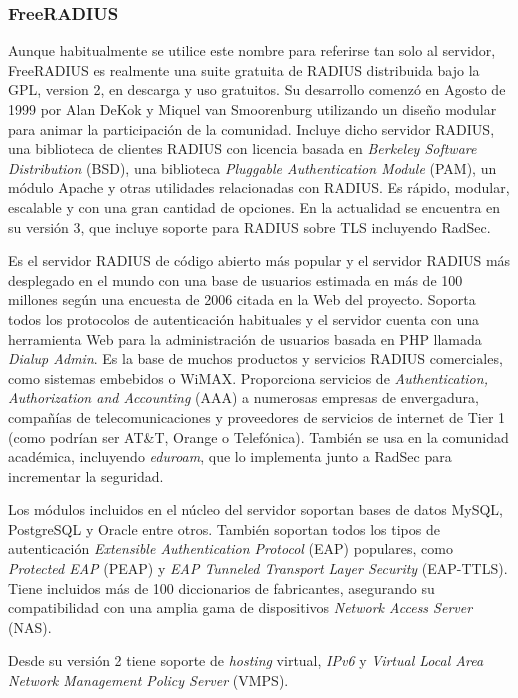 \subsubsection{FreeRADIUS}

Aunque habitualmente se utilice este nombre para referirse tan solo al servidor, FreeRADIUS es realmente una suite gratuita de RADIUS distribuida bajo la \acrshort{GPL}, version 2, en descarga y uso gratuitos. Su desarrollo comenzó en Agosto de 1999 por Alan DeKok y Miquel van Smoorenburg utilizando un diseño modular para animar la participación de la comunidad. Incluye dicho servidor RADIUS, una biblioteca de clientes RADIUS con licencia basada en \emph{Berkeley Software Distribution} (\acrshort{BSD}), una biblioteca \emph{Pluggable Authentication Module} (\acrshort{PAM}), un módulo Apache y otras utilidades relacionadas con RADIUS. Es rápido, modular, escalable y con una gran cantidad de opciones. En la actualidad se encuentra en su versión 3, que incluye soporte para RADIUS sobre TLS incluyendo RadSec.

Es el servidor RADIUS de código abierto más popular y el servidor RADIUS más desplegado en el mundo con una base de usuarios estimada en más de 100 millones según una encuesta de 2006 citada en la Web del proyecto. Soporta todos los protocolos de autenticación habituales y el servidor cuenta con una herramienta Web para la administración de usuarios basada en PHP llamada \emph{Dialup Admin}. Es la base de muchos productos y servicios RADIUS comerciales, como sistemas embebidos o WiMAX. Proporciona servicios de \emph{Authentication, Authorization and Accounting} (AAA) a numerosas empresas de envergadura, compañías de telecomunicaciones y proveedores de servicios de internet de Tier 1 (como podrían ser AT\&T, Orange o Telefónica). También se usa en la comunidad académica, incluyendo \emph{eduroam}, que lo implementa junto a RadSec para incrementar la seguridad.

Los módulos incluidos en el núcleo del servidor soportan bases de datos MySQL, PostgreSQL y Oracle entre otros. También soportan todos los tipos de autenticación \emph{Extensible Authentication Protocol} (EAP) populares, como \emph{Protected EAP} (\acrshort{PEAP}) y \emph{EAP Tunneled Transport Layer Security} (\acrshort{EAP-TTLS}). Tiene incluidos más de 100 diccionarios de fabricantes, asegurando su compatibilidad con una amplia gama de dispositivos \emph{Network Access Server} (NAS).

Desde su versión 2 tiene soporte de \emph{hosting} virtual, \emph{IPv6} y \emph{Virtual Local Area Network Management Policy Server} (VMPS).

